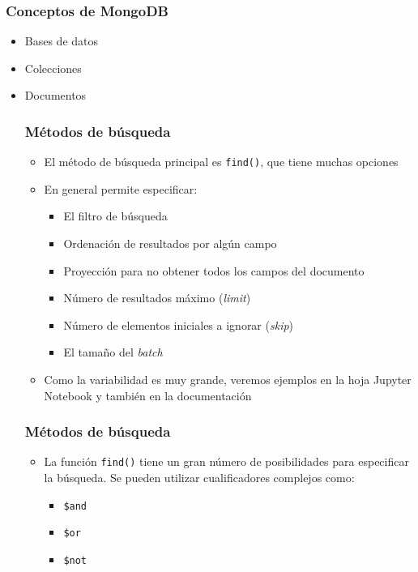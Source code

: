 \documentclass[14pt]{beamer}
\begin{document}
\begin{frame}
  \frametitle{Conceptos de MongoDB}
  \begin{itemize}
  \item Bases de datos
  \item Colecciones
  \item Documentos

\begin{frame}
  \frametitle{Métodos de búsqueda}
  \begin{itemize}
  \item El método de búsqueda principal es {\tt find()}, que tiene muchas
    opciones
  \item En general permite especificar:

    \begin{itemize}
    \item El filtro de búsqueda
    \item Ordenación de resultados por algún campo
    \item Proyección para no obtener todos los campos del documento
    \item Número de resultados máximo ({\em limit\/})
    \item Número de elementos iniciales a ignorar ({\em skip\/})
    \item El tamaño del {\em batch}
    \end{itemize}

  \item Como la variabilidad es muy grande, veremos ejemplos en la hoja
    Jupyter Notebook y también en la documentación

  \end{itemize}
\end{frame}

\begin{frame}
  \frametitle{Métodos de búsqueda}
  \begin{itemize}
  \item La función {\tt find()} tiene un gran número de posibilidades para
    especificar la búsqueda. Se pueden utilizar cualificadores complejos
    como:
    \begin{itemize}
    \item \verb|$and|
    \item \verb|$or|
    \item \verb|$not|
    \end{itemize}


\end{itemize}
\end{frame}
\end{itemize}
\end{frame}
\end{document}
